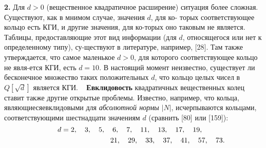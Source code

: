 %
\textbf{2.}  Для $d > 0$ (вещественное квадратичное расширение) ситуация\linebreak
более сложная. Существуют, как в мнимом случае, значения $d$, для ко- \linebreak торых соответствующее кольцо есть КГИ, и другие значения, для ко-\linebreak торых оно таковым не является. Таблицы, предоставляющие этот вид\linebreak
информации (для $d$, относящегося или нет к определенному типу), су-\linebreak ществуют в литературе, например, [28]. Там также утверждается, что\linebreak
самое маленькое $d > 0$, для которого соответствующее кольцо не явля-\linebreak ется КГИ, есть $d = 10.$ В настоящий момент неизвестно, существует\linebreak
ли бесконечное множество таких положительных $d$, что кольцо целых\linebreak
чисел в $Q[\sqrt{d}]$ является КГИ.
\ \newline
\hspace*{10pt} \textbf{Евклидовость} квадратичных вещественных колец ставит также\linebreak
другие открытые проблемы. Известно, например, что кольца, являющиеся\linebreak евклидовыми для \textit{абсолютной нормы} $|N|$, исчерпываются кольцами,\linebreak
соответствующими шестнадцати значениям $d$ (сравнить [80] или [159]):
$$d = 2,\hspace*{10pt} 3,\hspace*{10pt} 5,\hspace*{10pt} 6,\hspace*{10pt} 7,\hspace*{10pt} 11,\hspace*{10pt} 13,\hspace*{10pt} 17,\hspace*{10pt} 19,\hspace*{10pt}$$
	$$\hspace*{95pt}21,\hspace*{10pt} 29,\hspace*{10pt} 33,\hspace*{10pt} 37,\hspace*{10pt} 41,\hspace*{10pt} 57,\hspace*{10pt} 73.$$
